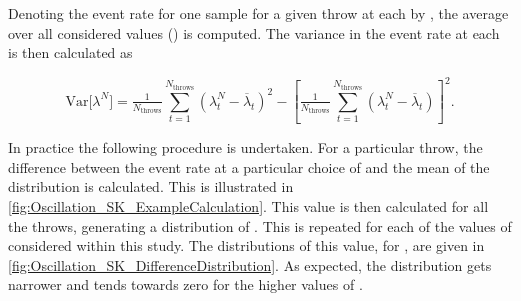 Denoting the event rate for one sample for a given throw  at each  by , the average over all considered  values () is computed. The variance in the event rate at each  is then calculated as

\begin{equation}
  \mathrm{Var}\Big[\lambda^{N}\Big] = \tfrac{1}{N_\mathrm{throws}} \sum_{t=1}^{N_\mathrm{throws}} \left(\lambda_t^{N} - \overline \lambda_t\right)^2 - \left[\tfrac{1}{N_\mathrm{throws}} \sum_{t=1}^{N_\mathrm{throws}} \left(\lambda_t^{N} - \overline \lambda_t\right)\right]^2 .
  \label{eq:Oscillation_SK_Variance}
\end{equation}

In practice the following procedure is undertaken. For a particular throw, the difference between the event rate at a particular choice of  and the mean of the distribution is calculated. This is illustrated in \autoref{fig:Oscillation_SK_ExampleCalculation}. This value is then calculated for all the  throws, generating a distribution of . This is repeated for each of the values of  considered within this study. The distributions of this value, for , are given in \autoref{fig:Oscillation_SK_DifferenceDistribution}. As expected, the distribution gets narrower and tends towards zero for the higher values of . 

